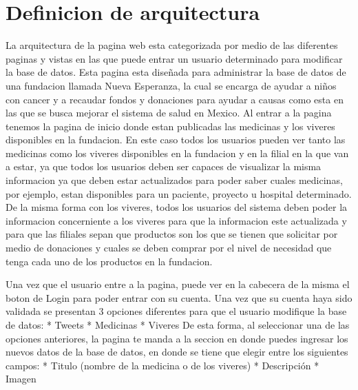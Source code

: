 \documentclass[12pt]{report}
\begin{document}
\section*{Definicion de arquitectura}
\begin{flushleft}
La arquitectura de la pagina web esta categorizada por medio de las diferentes paginas y vistas en las que puede entrar un usuario determinado para modificar la base de datos.
\newline
\newline
Esta pagina esta diseñada para administrar la base de datos de una fundacion llamada Nueva Esperanza, la cual se encarga de ayudar a niños con cancer y a recaudar fondos y donaciones para ayudar a causas como esta en las que se busca mejorar el sistema de salud en Mexico.
\newline
\newline
Al entrar a la pagina tenemos la pagina de inicio donde estan publicadas las medicinas y los viveres disponibles en la fundacion. En este caso todos los usuarios pueden ver tanto las medicinas como los viveres disponibles en la fundacion y en la filial en la que van a estar, ya que todos los usuarios deben ser capaces de visualizar la misma informacion ya que deben estar actualizados para poder saber cuales medicinas, por ejemplo, estan disponibles para un paciente, proyecto u hospital determinado.
De la misma forma con los viveres, todos los usuarios del sistema deben poder la informacion concerniente a los viveres para que la informacion este actualizada y para que las filiales sepan que productos son los que se tienen que solicitar por medio de donaciones y cuales se deben comprar por el nivel de necesidad que tenga cada uno de los productos en la fundacion.

Una vez que el usuario entre a la pagina, puede ver en la cabecera de la misma el boton de Login para poder entrar con su cuenta. Una vez que su cuenta haya sido validada se presentan 3 opciones diferentes para que el usuario modifique la base de datos:
\newline
* Tweets
\newline
* Medicinas
\newline
* Viveres
\newline
\newline
De esta forma, al seleccionar una de las opciones anteriores, la pagina te manda a la seccion en donde puedes ingresar los nuevos datos de la base de datos, en donde se tiene que elegir entre los siguientes campos:
\newline
* Titulo (nombre de la medicina o de los viveres)
\newline
* Descripción
\newline
* Imagen
\newline
\newline
\end{flushleft}
\end{document}
